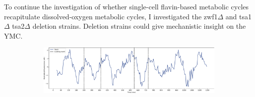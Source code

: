 To continue the investigation of whether single-cell flavin-based metabolic cycles recapitulate dissolved-oxygen metabolic cycles, I investigated the zwf1$\Delta$ and tsa1$\Delta$ tsa2$\Delta$ deletion strains.
Deletion strains could give mechanistic insight on the YMC.


\begin{figure}
  \centering
  \begin{subfigure}[t]{1.0\textwidth}
   \centering
   \includegraphics[width=\textwidth]{409_zwf1egf_010-44-1_edit.pdf}
   \caption{
   }
   \label{fig:biology-zwf1-single}
  \end{subfigure}


\end{figure}
